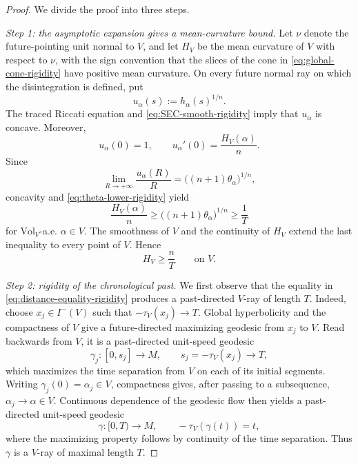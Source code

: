 \documentclass[a4paper,10pt]{article}
\newcommand{\vol}{\mathrm{Vol}}
\theoremstyle{plain}
\theoremstyle{definition}
\numberwithin{equation}{section}
\begin{document}
\begin{proof}
We divide the proof into three steps.

\emph{Step 1: the asymptotic expansion gives a mean-curvature
bound.}
Let $\nu$ denote the future-pointing unit normal to $V$, and let
$H_V$ be the mean curvature of $V$ with respect to $\nu$, with the
sign convention that the slices of the cone in
\eqref{eq:global-cone-rigidity} have positive mean curvature. On every
future normal ray on which the disintegration is defined, put
\[
    u_\alpha(s):=h_\alpha(s)^{1/n}.
\]
The traced Riccati equation and
\eqref{eq:SEC-smooth-rigidity} imply that $u_\alpha$ is concave.
Moreover,
\begin{equation}\label{eq:ualpha0}
    u_\alpha(0)=1,
    \qquad
    u_\alpha'(0)=\frac{H_V(\alpha)}{n}.
\end{equation}
Since
\begin{equation}\label{eq:ualphaInfty}
    \lim_{R\to+\infty}\frac{u_\alpha(R)}{R}
    =\bigl((n+1)\theta_\alpha\bigr)^{1/n},
\end{equation}
concavity and \eqref{eq:theta-lower-rigidity} yield
\begin{equation}\label{eq:H-lower-rigidity}
    \frac{H_V(\alpha)}{n}
    \geq \bigl((n+1)\theta_\alpha\bigr)^{1/n}
    \geq \frac1T
\end{equation}
for $\vol_V$-a.e. $\alpha\in V$. The smoothness of $V$ and the
continuity of $H_V$ extend the last inequality to every point of
$V$. Hence
\begin{equation}\label{eq:H-global-rigidity}
    H_V\geq \frac nT
    \qquad\text{on $V$}.
\end{equation}

\emph{Step 2: rigidity of the chronological past.}
We first observe that the equality in
\eqref{eq:distance-equality-rigidity} produces a past-directed
$V$-ray of length $T$. Indeed, choose $x_j\in I^-(V)$ such that
$-\tau_V(x_j)\to T$. Global hyperbolicity and the compactness of $V$
give a future-directed maximizing geodesic from $x_j$ to $V$. Read
backwards from $V$, it is a past-directed unit-speed  geodesic
\[
    \gamma_j:[0,s_j]\longrightarrow M,
    \qquad s_j=-\tau_V(x_j)\longrightarrow T,
\]
which maximizes the time separation from $V$ on each of its initial
segments. Writing $\gamma_j(0)=\alpha_j\in V$, compactness gives,
after passing to a subsequence, $\alpha_j\to\alpha\in V$. Continuous
dependence of the geodesic flow then yields a past-directed
unit-speed geodesic
\[
    \gamma:[0,T)\longrightarrow M,
    \qquad -\tau_V(\gamma(t))=t,
\]
where the maximizing property follows by continuity of the time
separation. Thus $\gamma$ is a $V$-ray of maximal length $T$.


\end{proof}
\end{document}

